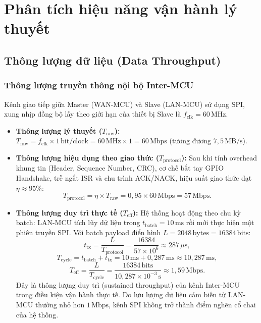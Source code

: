 \section{Phân tích hiệu năng vận hành lý thuyết}

\subsection{Thông lượng dữ liệu (Data Throughput)}

\subsubsection{Thông lượng truyền thông nội bộ Inter-MCU}
Kênh giao tiếp giữa Master (WAN-MCU) và Slave (LAN-MCU) sử dụng SPI, xung nhịp đồng bộ lấy theo giới hạn của thiết bị Slave là $f_{\text{clk}} = 60\,\text{MHz}$.
\begin{itemize}
    \item \textbf{Thông lượng lý thuyết ($T_{\text{raw}}$):}
    $T_{\text{raw}} = f_{\text{clk}} \times 1\,\text{bit/clock} = 60\,\text{MHz} \times 1 = 60\,\text{Mbps}$
    (tương đương $7{,}5\,\text{MB/s}$).

    \item \textbf{Thông lượng hiệu dụng theo giao thức ($T_{\text{protocol}}$):}
    Sau khi tính overhead khung tin (Header, Sequence Number, CRC), cơ chế bắt tay GPIO Handshake, trễ ngắt ISR và chu trình ACK/NACK, hiệu suất giao thức đạt $\eta \approx 95\%$:
    \[
        T_{\text{protocol}} = \eta \times T_{\text{raw}} = 0{,}95 \times 60\,\text{Mbps} = 57\,\text{Mbps}.
    \]

    \item \textbf{Thông lượng duy trì thực tế ($T_{\text{eff}}$):}
    Hệ thống hoạt động theo chu kỳ batch: LAN-MCU tích lũy dữ liệu trong $t_{\text{batch}} = 10\,\text{ms}$ rồi mới thực hiện một phiên truyền SPI. Với batch payload điển hình $L = 2048\,\text{bytes} = 16384\,\text{bits}$:
    \[
        t_{\text{tx}} = \frac{L}{T_{\text{protocol}}} = \frac{16384}{57 \times 10^{6}} \approx 287\,\mu\text{s},
    \]
    \[
        T_{\text{cycle}} = t_{\text{batch}} + t_{\text{tx}} = 10\,\text{ms} + 0{,}287\,\text{ms} \approx 10{,}287\,\text{ms},
    \]
    \[
        T_{\text{eff}} = \frac{L}{T_{\text{cycle}}} = \frac{16384\,\text{bits}}{10{,}287 \times 10^{-3}\,\text{s}} \approx 1{,}59\,\text{Mbps}.
    \]
    Đây là thông lượng duy trì (sustained throughput) của kênh Inter-MCU trong điều kiện vận hành thực tế. Do lưu lượng dữ liệu cảm biến từ LAN-MCU thường nhỏ hơn $1\,\text{Mbps}$, kênh SPI không trở thành điểm nghẽn cổ chai của hệ thống.
\end{itemize}


